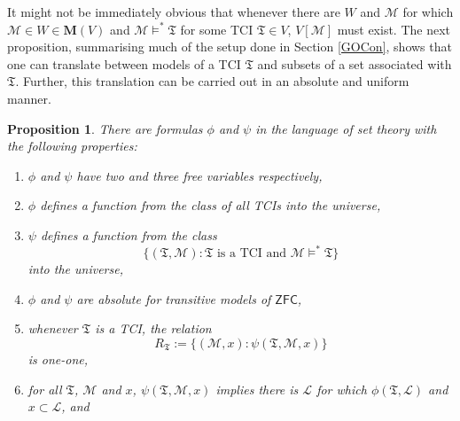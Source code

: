 \documentclass[12pt, twoside]{memoir}
\numberwithin{equation}{section}
\newtheorem{prop}[thm]{Proposition}
\theoremstyle{definition}
\theoremstyle{remark}
\theoremstyle{definition}
\theoremstyle{definition}
\theoremstyle{definition}
\theoremstyle{remark}
\begin{document}
It might not be immediately obvious that whenever there are $W$ and $\mathcal{M}$ for which $\mathcal{M} \in W \in \mathbf{M}(V)$ and $\mathcal{M} \models^* \mathfrak{T}$ for some TCI $\mathfrak{T} \in V$, $V[\mathcal{M}]$ must exist. The next proposition, summarising much of the setup done in Section \ref{GOCon}, shows that one can translate between models of a TCI $\mathfrak{T}$ and subsets of a set associated with $\mathfrak{T}$. Further, this translation can be carried out in an absolute and uniform manner.

\begin{prop}\label{prop322}
There are formulas $\phi$ and $\psi$ in the language of set theory with the following properties: 
\begin{enumerate}[label=(\arabic*)]
    \item $\phi$ and $\psi$ have two and three free variables respectively,
    \item $\phi$ defines a function from the class of all TCIs into the universe,
    \item $\psi$ defines a function from the class
    \begin{equation*}
        \{(\mathfrak{T}, \mathcal{M}) : \mathfrak{T} \text{ is a TCI and } \mathcal{M} \models^* \mathfrak{T}\}
    \end{equation*}
    into the universe,
    \item $\phi$ and $\psi$ are absolute for transitive models of $\mathsf{ZFC}$,
    \item\label{3245} whenever $\mathfrak{T}$ is a TCI, the relation
    \begin{equation*}
        R_{\mathfrak{T}} := \{(\mathcal{M}, x) : \psi(\mathfrak{T}, \mathcal{M}, x)\}
    \end{equation*}
    is one-one, 
    \item\label{3246} for all $\mathfrak{T}$, $\mathcal{M}$ and $x$, $\psi(\mathfrak{T}, \mathcal{M}, x)$ implies there is $\mathcal{L}$ for which $\phi(\mathfrak{T}, \mathcal{L})$ and $x \subset \mathcal{L}$, and
\end{enumerate}
\end{prop}
\end{document}
